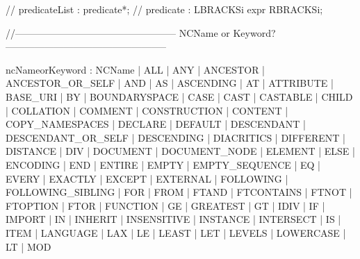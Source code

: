 //  predicateList                     : predicate*;
//    predicate                         : LBRACKSi expr RBRACKSi;     


//-------------------------------------------------- NCName or Keyword? --------------------------------------------------

ncNameorKeyword              : NCName
                    | ALL
                    | ANY
                    | ANCESTOR
                    | ANCESTOR_OR_SELF
                    | AND
                    | AS
                    | ASCENDING
                    | AT
                    | ATTRIBUTE
                    | BASE_URI
                    | BY
                    | BOUNDARYSPACE
                    | CASE
                    | CAST
                    | CASTABLE
                    | CHILD
                    | COLLATION
                    | COMMENT
                    | CONSTRUCTION
                    | CONTENT
                    | COPY_NAMESPACES
                    | DECLARE
                    | DEFAULT
                    | DESCENDANT
                    | DESCENDANT_OR_SELF
                    | DESCENDING
                    | DIACRITICS
                    | DIFFERENT
                    | DISTANCE
                    | DIV
                    | DOCUMENT
                    | DOCUMENT_NODE
                    | ELEMENT
                    | ELSE
                    | ENCODING
                    | END
                    | ENTIRE
                    | EMPTY
                    | EMPTY_SEQUENCE
                    | EQ
                    | EVERY
                    | EXACTLY
                    | EXCEPT
                    | EXTERNAL
                    | FOLLOWING
                    | FOLLOWING_SIBLING
                    | FOR
                    | FROM
                    | FTAND
                    | FTCONTAINS
                    | FTNOT
                    | FTOPTION
                    | FTOR
                    | FUNCTION
                    | GE
                    | GREATEST
                    | GT
                    | IDIV
                    | IF
                    | IMPORT
                    | IN
                    | INHERIT
                    | INSENSITIVE
                    | INSTANCE
                    | INTERSECT
                    | IS
                    | ITEM
                    | LANGUAGE
                    | LAX
                    | LE
                    | LEAST
                    | LET
                    | LEVELS
                    | LOWERCASE
                    | LT
                    | MOD
